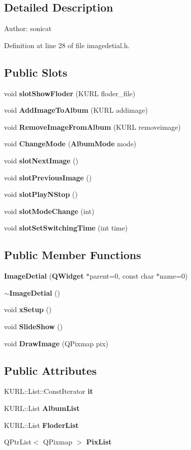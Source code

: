 \subsection{Detailed Description}
\begin{Desc}
\item[Author:]sonicat \end{Desc}




Definition at line 28 of file imagedetial.h.\subsection*{Public Slots}
\begin{CompactItemize}
\item 
void {\bf slot\-Show\-Floder} (KURL floder\_\-file)
\item 
void {\bf Add\-Image\-To\-Album} (KURL addimage)
\item 
void {\bf Remove\-Image\-From\-Album} (KURL removeimage)
\item 
void {\bf Change\-Mode} ({\bf Album\-Mode} mode)
\item 
void {\bf slot\-Next\-Image} ()
\item 
void {\bf slot\-Previous\-Image} ()
\item 
void {\bf slot\-Play\-NStop} ()
\item 
void {\bf slot\-Mode\-Change} (int)
\item 
void {\bf slot\-Set\-Switching\-Time} (int time)
\end{CompactItemize}
\subsection*{Public Member Functions}
\begin{CompactItemize}
\item 
{\bf Image\-Detial} ({\bf QWidget} $\ast$parent=0, const char $\ast$name=0)
\item 
{\bf $\sim$Image\-Detial} ()
\item 
void {\bf x\-Setup} ()
\item 
void {\bf Slide\-Show} ()
\item 
void {\bf Draw\-Image} (QPixmap pix)
\end{CompactItemize}
\subsection*{Public Attributes}
\begin{CompactItemize}
\item 
KURL::List::Const\-Iterator {\bf it}
\item 
KURL::List {\bf Album\-List}
\item 
KURL::List {\bf Floder\-List}
\item 
QPtr\-List$<$ QPixmap $>$ {\bf Pix\-List}
\end{CompactItemize}


